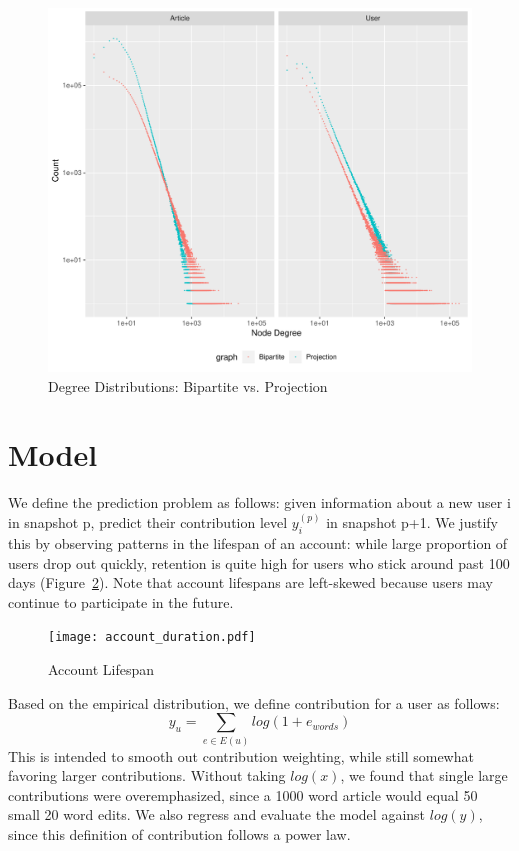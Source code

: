 \documentclass[letterpaper, 12pt, conference]{ieeeconf}
\begin{document}
\begin{figure}[ht]
    \centering
    \includegraphics[width=1\linewidth]{proj_vs_bipartite.pdf}
    \caption{Degree Distributions: Bipartite vs. Projection}
    \label{fig:proj_vs_bipartite}
\end{figure}

\section{Model}

We define the prediction problem as follows: given information about a new user i in snapshot p, predict their contribution level $y_i^{(p)}$ in snapshot p+1. We justify this by observing patterns in the lifespan of an account: while large proportion of users drop out quickly, retention is quite high for users who stick around past 100 days (Figure~\ref{fig:account_duration}). Note that account lifespans are left-skewed because users may continue to participate in the future.

\begin{figure}[ht]
    \centering
    \texttt{[image: account\_duration.pdf]}
    \caption{Account Lifespan}
    \label{fig:account_duration}
\end{figure}

Based on the empirical distribution, we define contribution for a user as follows:
\begin{equation}
    y_u = \sum_{e \in E(u)} log(1+e_{words})
\end{equation}
This is intended to smooth out contribution weighting, while still somewhat favoring larger contributions. Without taking $log(x)$, we found that single large contributions were overemphasized, since a 1000 word article would equal 50 small 20 word edits. We also regress and evaluate the model against $log(y)$, since this definition of contribution follows a power law.
\end{document}
